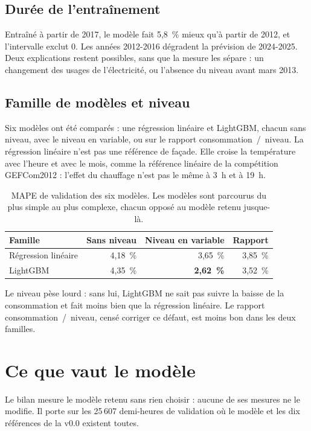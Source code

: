 \documentclass[11pt,a4paper]{article}
\begin{document}
\subsection{Durée de l'entraînement}

Entraîné à partir de 2017, le modèle fait 5,8~\% mieux qu'à partir de 2012, et l'intervalle exclut 0. Les années 2012-2016 dégradent la prévision de 2024-2025. Deux explications restent possibles, sans que la mesure les sépare : un changement des usages de l'électricité, ou l'absence du niveau avant mars 2013.

\subsection{Famille de modèles et niveau}

Six modèles ont été comparés : une régression linéaire et LightGBM, chacun sans niveau, avec le niveau en variable, ou sur le rapport consommation~/~niveau. La régression linéaire n'est pas une référence de façade. Elle croise la température avec l'heure et avec le mois, comme la référence linéaire de la compétition GEFCom2012 : l'effet du chauffage n'est pas le même à 3~h et à 19~h.

\begin{table}[H]
\small
\begin{tabularx}{\linewidth}{Yrrr}
\toprule
\textbf{Famille} & \textbf{Sans niveau} & \textbf{Niveau en variable} & \textbf{Rapport} \\
\midrule
Régression linéaire & 4,18~\% & 3,65~\% & 3,85~\% \\
LightGBM & 4,35~\% & \textbf{2,62~\%} & 3,52~\% \\
\bottomrule
\end{tabularx}
\caption{MAPE de validation des six modèles. Les modèles sont parcourus du plus simple au plus complexe, chacun opposé au modèle retenu jusque-là.}
\end{table}

Le niveau pèse lourd : sans lui, LightGBM ne sait pas suivre la baisse de la consommation et fait moins bien que la régression linéaire. Le rapport consommation~/~niveau, censé corriger ce défaut, est moins bon dans les deux familles.

\section{Ce que vaut le modèle}

Le bilan mesure le modèle retenu sans rien choisir : aucune de ses mesures ne le modifie. Il porte sur les 25\,607 demi-heures de validation où le modèle et les dix références de la v0.0 existent toutes.
\end{document}
